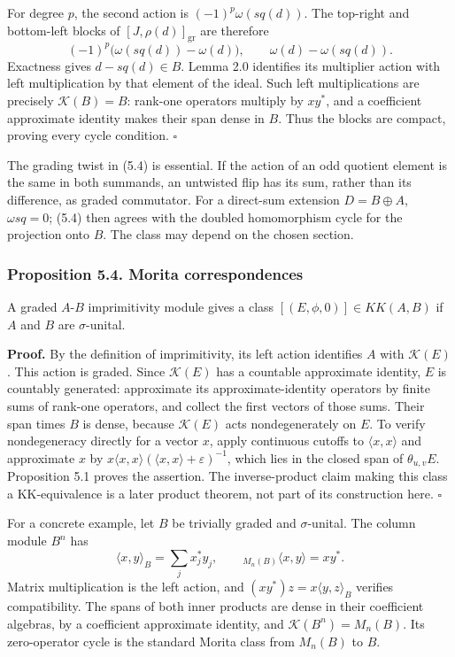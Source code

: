 \documentclass[
  11pt,
]{article}
\begin{document}
For degree \(p\), the second action is \((-1)^p\omega(sq(d))\). The
top-right and bottom-left blocks of \([J,\rho(d)]_{\mathrm{gr}}\) are
therefore \[
(-1)^p\bigl(\omega(sq(d))-\omega(d)\bigr),
\qquad\omega(d)-\omega(sq(d)).
\] Exactness gives \(d-sq(d)\in B\). Lemma 2.0 identifies its multiplier
action with left multiplication by that element of the ideal. Such left
multiplications are precisely \(\mathcal K(B)=B\): rank-one operators
multiply by \(xy^*\), and a coefficient approximate identity makes their
span dense in \(B\). Thus the blocks are compact, proving every cycle
condition. \(\square\)

The grading twist in (5.4) is essential. If the action of an odd
quotient element is the same in both summands, an untwisted flip has its
sum, rather than its difference, as graded commutator. For a direct-sum
extension \(D=B\oplus A\), \(\omega sq=0\); (5.4) then agrees with the
doubled homomorphism cycle for the projection onto \(B\). The class may
depend on the chosen section.

\subsubsection{Proposition 5.4. Morita
correspondences}\label{proposition-5.4.-morita-correspondences}

A graded \(A\)-\(B\) imprimitivity module gives a class
\([(E,\phi,0)]\in KK(A,B)\) if \(A\) and \(B\) are \(\sigma\)-unital.

\textbf{Proof.} By the definition of imprimitivity, its left action
identifies \(A\) with \(\mathcal K(E)\). This action is graded. Since
\(\mathcal K(E)\) has a countable approximate identity, \(E\) is
countably generated: approximate its approximate-identity operators by
finite sums of rank-one operators, and collect the first vectors of
those sums. Their span times \(B\) is dense, because \(\mathcal K(E)\)
acts nondegenerately on \(E\). To verify nondegeneracy directly for a
vector \(x\), apply continuous cutoffs to \(\langle x,x\rangle\) and
approximate \(x\) by
\(x\langle x,x\rangle(\langle x,x\rangle+\varepsilon)^{-1}\), which lies
in the closed span of \(\theta_{u,v}E\). Proposition 5.1 proves the
assertion. The inverse-product claim making this class a KK-equivalence
is a later product theorem, not part of its construction here.
\(\square\)

For a concrete example, let \(B\) be trivially graded and
\(\sigma\)-unital. The column module \(B^n\) has \[
\langle x,y\rangle_B=\sum_jx_j^*y_j,\qquad
{}_{M_n(B)}\langle x,y\rangle=xy^*.
\] Matrix multiplication is the left action, and
\((xy^*)z=x\langle y,z\rangle_B\) verifies compatibility. The spans of
both inner products are dense in their coefficient algebras, by a
coefficient approximate identity, and \(\mathcal K(B^n)=M_n(B)\). Its
zero-operator cycle is the standard Morita class from \(M_n(B)\) to
\(B\).
\end{document}
